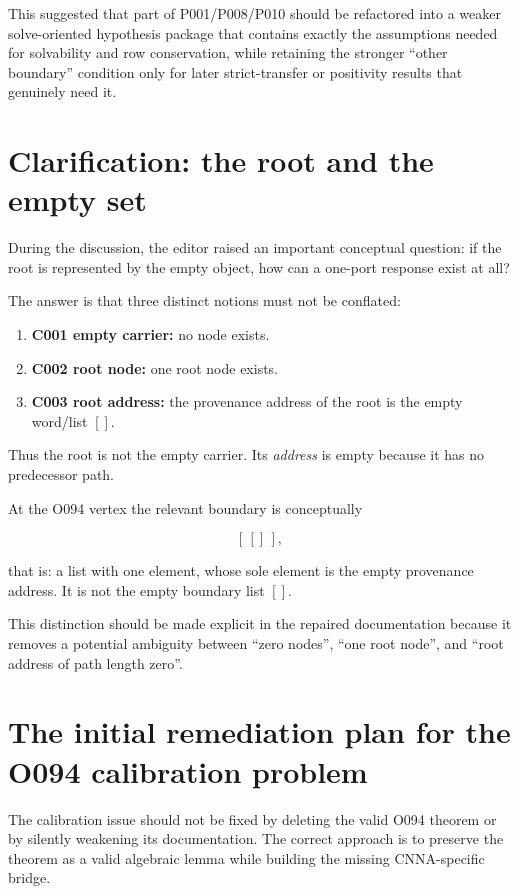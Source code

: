 \documentclass[11pt,a4paper]{article}
\begin{document}
This suggested that part of P001/P008/P010 should be refactored into a weaker solve-oriented hypothesis package that contains exactly the assumptions needed for solvability and row conservation, while retaining the stronger ``other boundary'' condition only for later strict-transfer or positivity results that genuinely need it.

\section{Clarification: the root and the empty set}

During the discussion, the editor raised an important conceptual question: if the root is represented by the empty object, how can a one-port response exist at all?

The answer is that three distinct notions must not be conflated:

\begin{enumerate}
  \item \textbf{C001 empty carrier:} no node exists.
  \item \textbf{C002 root node:} one root node exists.
  \item \textbf{C003 root address:} the provenance address of the root is the empty word/list $[]$.
\end{enumerate}

Thus the root is not the empty carrier. Its \emph{address} is empty because it has no predecessor path.

At the O094 vertex the relevant boundary is conceptually

\[
[\,[]\,],
\]

that is: a list with one element, whose sole element is the empty provenance address. It is not the empty boundary list $[]$.

This distinction should be made explicit in the repaired documentation because it removes a potential ambiguity between ``zero nodes'', ``one root node'', and ``root address of path length zero''.

\section{The initial remediation plan for the O094 calibration problem}

The calibration issue should not be fixed by deleting the valid O094 theorem or by silently weakening its documentation. The correct approach is to preserve the theorem as a valid algebraic lemma while building the missing CNNA-specific bridge.
\end{document}
